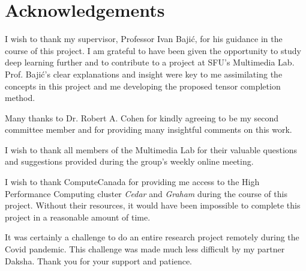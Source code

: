 
\chapter*{Acknowledgements}

I wish to thank my supervisor, Professor Ivan Baji{\'c}, for his guidance in the course of this project. I am grateful to have been given the opportunity to study deep learning further and to contribute to a project at SFU's Multimedia Lab. Prof. Baji{\'c}'s clear explanations and insight were key to me assimilating the concepts in this project and me developing the proposed tensor completion method.

Many thanks to Dr. Robert A. Cohen for kindly agreeing to be my second committee member and for providing many insightful comments on this work.

I wish to thank all members of the Multimedia Lab for their valuable questions and suggestions provided during the group's weekly online meeting.

I wish to thank ComputeCanada for providing me access to the High Performance Computing cluster \textit{Cedar} and \textit{Graham} during the course of this project. Without their resources, it would have been impossible to complete this project in a reasonable amount of time.

It was certainly a challenge to do an entire research project remotely during the Covid pandemic. This challenge was made much less difficult by my partner Daksha. Thank you for your support and patience.